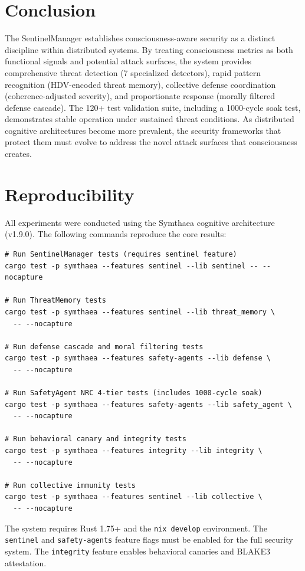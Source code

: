 \documentclass[11pt,a4paper]{article}
\begin{document}
\section{Conclusion}

The SentinelManager establishes consciousness-aware security as a distinct discipline within distributed systems. By treating consciousness metrics as both functional signals and potential attack surfaces, the system provides comprehensive threat detection (7 specialized detectors), rapid pattern recognition (HDV-encoded threat memory), collective defense coordination (coherence-adjusted severity), and proportionate response (morally filtered defense cascade). The 120+ test validation suite, including a 1000-cycle soak test, demonstrates stable operation under sustained threat conditions. As distributed cognitive architectures become more prevalent, the security frameworks that protect them must evolve to address the novel attack surfaces that consciousness creates.

\section{Reproducibility}

All experiments were conducted using the Symthaea cognitive architecture (v1.9.0). The following commands reproduce the core results:

\begin{verbatim}
# Run SentinelManager tests (requires sentinel feature)
cargo test -p symthaea --features sentinel --lib sentinel -- --nocapture

# Run ThreatMemory tests
cargo test -p symthaea --features sentinel --lib threat_memory \
  -- --nocapture

# Run defense cascade and moral filtering tests
cargo test -p symthaea --features safety-agents --lib defense \
  -- --nocapture

# Run SafetyAgent NRC 4-tier tests (includes 1000-cycle soak)
cargo test -p symthaea --features safety-agents --lib safety_agent \
  -- --nocapture

# Run behavioral canary and integrity tests
cargo test -p symthaea --features integrity --lib integrity \
  -- --nocapture

# Run collective immunity tests
cargo test -p symthaea --features sentinel --lib collective \
  -- --nocapture
\end{verbatim}

The system requires Rust 1.75+ and the \texttt{nix develop} environment. The \texttt{sentinel} and \texttt{safety-agents} feature flags must be enabled for the full security system. The \texttt{integrity} feature enables behavioral canaries and BLAKE3 attestation.
\end{document}
